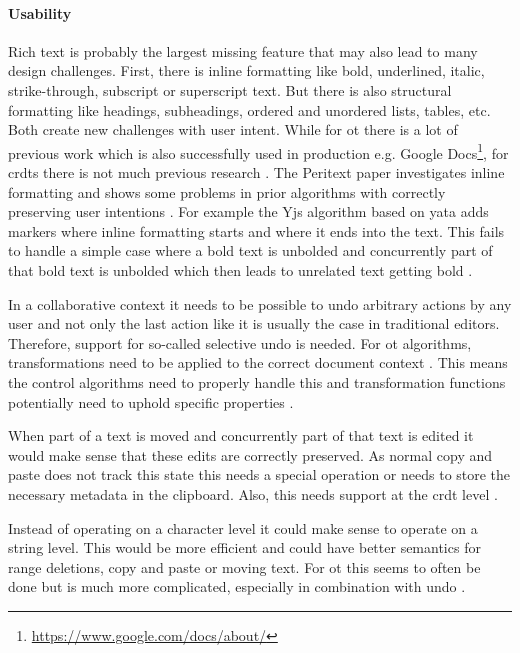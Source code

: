 \paragraph{Usability} \label{future-work-usability}

Rich text is probably the largest missing feature that may also lead to many design challenges. First, there is inline formatting like bold, underlined, italic, strike-through, subscript or superscript text. But there is also structural formatting like headings, subheadings, ordered and unordered lists, tables, etc. Both create new challenges with user intent. While for \gls{ot} there is a lot of previous work which is also successfully used in production e.g. Google Docs\footnote{\url{https://www.google.com/docs/about/}}, for \glspl{crdt} there is not much previous research \cite{2022-litt-peritext}. The Peritext paper \cite{2022-litt-peritext} investigates inline formatting and shows some problems in prior algorithms with correctly preserving user intentions \cite{2022-litt-peritext}. For example the Yjs algorithm based on \gls{yata} \cite{2016-yata-yjs} adds markers where inline formatting starts and where it ends into the text. This fails to handle a simple case where a bold text is unbolded and concurrently part of that bold text is unbolded which then leads to unrelated text getting bold \cite[Section 2.3.2]{2022-litt-peritext}.

In a collaborative context it needs to be possible to undo arbitrary actions by any user and not only the last action like it is usually the case in traditional editors. Therefore, support for so-called selective undo is needed. For \gls{ot} algorithms, transformations need to be applied to the correct document context \cite{2009-sun-ot-context-undo}. This means the control algorithms need to properly handle this and transformation functions potentially need to uphold specific properties \cite{2009-sun-ot-context-undo}.

When part of a text is moved and concurrently part of that text is edited it would make sense that these edits are correctly preserved. As normal copy and paste does not track this state this needs a special operation or needs to store the necessary metadata in the clipboard. Also, this needs support at the \gls{crdt} level \cite{2022-anjana-move,2023-kleppmann-json-move}.

Instead of operating on a character level it could make sense to operate on a string level. This would be more efficient and could have better semantics for range deletions, copy and paste or moving text. For \gls{ot} this seems to often be done but is much more complicated, especially in combination with undo \cite{2024-sun-ot-faq}.

